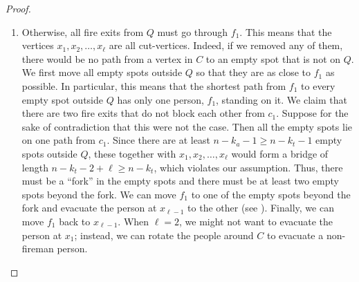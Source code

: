 \documentclass{mystyle}
\begin{document}
\begin{proof}
\begin{enumerate}
        \item Otherwise, all fire exits from $Q$ must go through $f_1$. This means that the vertices $x_1, x_2, \ldots, x_\ell$ are all cut-vertices. Indeed, if we removed any of them, there would be no path from a vertex in $C$ to an empty spot that is not on $Q$. We first move all empty spots outside $Q$ so that they are as close to $f_1$ as possible. In particular, this means that the shortest path from $f_1$ to every empty spot outside $Q$ has only one person, $f_1$, standing on it. We claim that there are two fire exits that do not block each other from $c_1$. Suppose for the sake of contradiction that this were not the case. Then all the empty spots lie on one path from $c_1$. Since there are at least $n - k_a - 1 \geq n - k_t - 1$ empty spots outside $Q$, these together with $x_1, x_2, \ldots, x_\ell$ would form a bridge of length $n - k_t - 2 +\ell\geq n - k_t$, which violates our assumption. Thus, there must be a ``fork'' in the empty spots and there must be at least two empty spots beyond the fork. We can move $f_1$ to one of the empty spots beyond the fork and evacuate the person at $x_{\ell - 1}$ to the other (see ). Finally, we can move $f_1$ back to $x_{\ell - 1}$. When $\ell = 2$, we might not want to evacuate the person at $x_1$; instead, we can rotate the people around $C$ to evacuate a non-fireman person. 

        \begin{figure}[ht]
            \centering
\end{figure}
\end{enumerate}
\end{proof}
\end{document}
